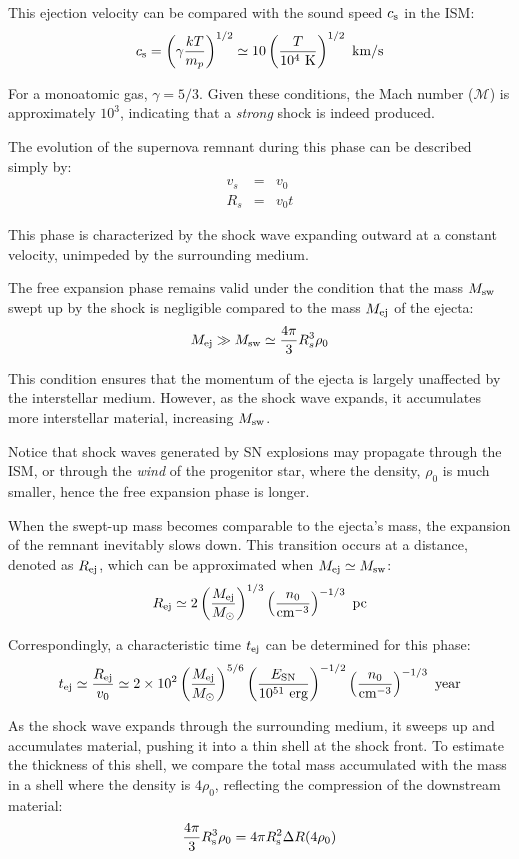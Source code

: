 This ejection velocity can be compared with the sound speed \( c_{\rm s} \) in the ISM:
%
\[
c_{\rm s} = \left( \gamma \frac{k T}{m_p} \right)^{1/2} \simeq 10 \left( \frac{T}{10^4~\text{K}} \right)^{1/2}~\text{km/s}
\]

For a monoatomic gas, \( \gamma = 5/3 \). Given these conditions, the Mach number (\( \mathcal M \)) is approximately \( 10^3 \), indicating that a \emph{strong} shock is indeed produced.

The evolution of the supernova remnant during this phase can be described simply by:
%
\begin{eqnarray*}
v_s & =  & v_0 \\
R_s & = & v_0 t 
\end{eqnarray*}

This phase is characterized by the shock wave expanding outward at a constant velocity, unimpeded by the surrounding medium.
 
The free expansion phase remains valid under the condition that the mass \( M_{\rm sw} \) swept up by the shock is negligible compared to the mass \( M_{\rm ej} \) of the ejecta:
%
\[
M_{\rm ej} \gg M_{\rm sw} \simeq \frac{4\pi}{3} R_s^3 \rho_0
\]

This condition ensures that the momentum of the ejecta is largely unaffected by the interstellar medium. However, as the shock wave expands, it accumulates more interstellar material, increasing \( M_{\rm sw} \).

Notice that shock waves generated by SN explosions may propagate through the ISM, or through the \emph{wind} of the progenitor star, where the density, \( \rho_0 \) is much smaller, hence the free expansion phase is longer.

When the swept-up mass becomes comparable to the ejecta's mass, the expansion of the remnant inevitably slows down. 
%
This transition occurs at a distance, denoted as \( R_{\rm ej} \), which can be approximated when \( M_{\rm ej} \simeq M_{\rm sw} \):
%
\[
R_{\rm ej} \simeq 2 \left( \frac{M_{\rm ej}}{M_\odot} \right)^{1/3} \left( \frac{n_0}{\text{cm}^{-3}} \right)^{-1/3}~\text{pc}
\]

Correspondingly, a characteristic time \( t_{\rm ej} \) can be determined for this phase:
%
\[
t_{\rm ej} \simeq \frac{R_{\rm ej}}{v_0} \simeq 2 \times 10^2 \left(\frac{M_{\rm ej}}{M_\odot}\right)^{5/6} \left(\frac{E_{\rm SN}}{10^{51}~\text{erg}}\right)^{-1/2} \left(\frac{n_0}{\text{cm}^{-3}}\right)^{-1/3}~\text{year}
\]

As the shock wave expands through the surrounding medium, it sweeps up and accumulates material, pushing it into a thin shell at the shock front. To estimate the thickness of this shell, we compare the total mass accumulated with the mass in a shell where the density is \( 4 \rho_0 \), reflecting the compression of the downstream material:
%
\[ \frac{4\pi}{3} R_{\rm s}^3 \rho_0 = 4 \pi R_{\rm s}^2 \Delta R (4 \rho_0) \]

